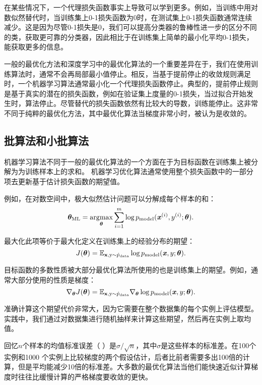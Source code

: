 在某些情况下，一个代理损失函数事实上导致可以学到更多。例如，当训练中用对数似然替代时，当训练集上0-1损失函数为0时，在测试集上0-1损失函数通常连续减少。这是因为尽管0-1损失是0，我们可以提高分类器的鲁棒性进一步的区分不同的类，获取更可靠的分类器，因此相比于在训练集上简单的最小化平均0-1损失，能获取更多的信息。

一般的最优化方法和深度学习中的最优化算法的一个重要差异在于，我们在使用训练算法时，通常不会再局部最小值停止。相反，当基于提前停止的收敛规则满足时，一个机器学习算法通常最小化一个代理损失函数停止。典型的，提前停止规则是基于真实的潜在的损失函数，例如在验证集上度量的0-1损失，当过拟合开始发生时，算法停止。尽管替代的损失函数依然有比较大的导数，训练能停止。这非常不同于纯粹的最优化方法，其中最优化算法当梯度非常小时，被认为是收敛的。

\subsection{批算法和小批算法}
机器学习算法不同于一般的最优化算法的一个方面在于为目标函数在训练集上被分解为为训练样本上的求和。
机器学习优化算法通常使用整个损失函数中的一部分项去更新基于估计损失函数的期望值。

例如，在对数空间中，极大似然估计问题可以分解成每个样本的和：
\begin{equation}
\label{eq:8.4}
    \boldsymbol{\theta}_{\text{ML}} = \underset{\boldsymbol{\theta}}{\arg\!\max} \sum_{i=1}^m
    \log p_{\text{model}} (\boldsymbol{\mathit{x}}^{(i)}, y^{(i)}; \boldsymbol{\theta}) .
\end{equation}

最大化此项等价于最大化定义在训练集上的经验分布的期望：
\begin{equation}
\label{eq:8.5}
    J(\boldsymbol{\theta}) = \mathbb{E}_{\mathbf{x}, \mathrm{y} \sim\hat{p}_\text{data}}
    \log p_{\text{model}} (\boldsymbol{\mathit{x}},y ; \boldsymbol{\theta}) .
\end{equation}

目标函数的多数性质被大部分最优化算法所使用的也是训练集上的期望。例如，通常大部分使用的性质是梯度：
\begin{equation}
\label{eq:8.6}
    \nabla_{\boldsymbol{\theta}} J(\boldsymbol{\theta}) = \mathbb{E}_{\mathbf{x}, \mathrm{y} \sim\hat{p}_{\text{data}}}
    \nabla_{\boldsymbol{\theta}} \log p_{\text{model}} (\boldsymbol{\mathit{x}},y; \boldsymbol{\theta}) .
\end{equation}

准确计算这个期望代价非常大，因为它需要在整个数据集的每个实例上评估模型。实践中，我们通过对数据集进行随机抽样来计算这些期望，然后再在实例上取均值。

回忆$n$个样本的均值标准误差（ ）是$\sigma/\sqrt{n}$，其中$\sigma$是这些样本的标准差。在100个实例和1000 个实例上比较梯度的两个假设估计，后者比前者需要多出100倍的计算，但是平均能减少10倍的标准差。大多数的最优化算法当他们能快速近似计算梯度时往往比缓慢计算的严格梯度要收敛的更快。

